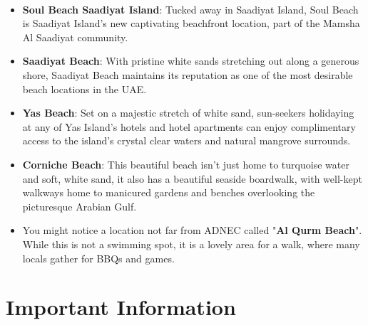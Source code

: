 \\
\begin{itemize}[noitemsep]
    \item \textbf{Soul Beach Saadiyat Island}: Tucked away in Saadiyat Island, Soul Beach is Saadiyat Island’s new captivating beachfront location, part of the Mamsha Al Saadiyat community.
    \item \textbf{Saadiyat Beach}: With pristine white sands stretching out along a generous shore, Saadiyat Beach maintains its reputation as one of the most desirable beach locations in the UAE.
    \item \textbf{Yas Beach}: Set on a majestic stretch of white sand, sun-seekers holidaying at any of Yas Island’s hotels and hotel apartments can enjoy complimentary access to the island’s crystal clear waters and natural mangrove surrounds.
    \item \textbf{Corniche Beach}: This beautiful beach isn’t just home to turquoise water and soft, white sand, it also has a beautiful seaside boardwalk, with well-kept walkways home to manicured gardens and benches overlooking the picturesque Arabian Gulf.
    \item You might notice a location not far from ADNEC called "\textbf{Al Qurm Beach}". While this is not a swimming spot, it is a lovely area for a walk, where many locals gather for BBQs and games.
\end{itemize}


 \leavevmode\newline
\section{Important Information}

\\
\\

\\
\\

